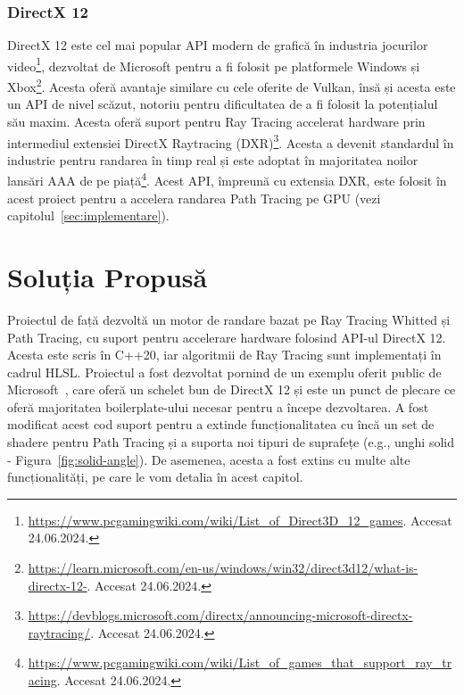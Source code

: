 \documentclass[12pt,a4paper]{report}
\numberwithin{equation}{section} %
\begin{document}
\subsection{DirectX 12}

DirectX 12 este cel mai popular API modern de grafică în industria jocurilor video\footnote{\url{https://www.pcgamingwiki.com/wiki/List_of_Direct3D_12_games}. Accesat 24.06.2024.},
dezvoltat de Microsoft pentru a fi folosit pe platformele Windows și Xbox\footnote{\url{https://learn.microsoft.com/en-us/windows/win32/direct3d12/what-is-directx-12-}. Accesat 24.06.2024.}.
Acesta oferă avantaje similare cu cele oferite de Vulkan, însă și acesta este
un API de nivel scăzut, notoriu pentru dificultatea de a fi folosit la potențialul său maxim.
Acesta oferă suport pentru Ray Tracing accelerat hardware
prin intermediul extensiei DirectX Raytracing (DXR)\footnote{\url{https://devblogs.microsoft.com/directx/announcing-microsoft-directx-raytracing/}. Accesat 24.06.2024.}.
Acesta a devenit standardul în industrie pentru randarea în timp real și este
adoptat în majoritatea noilor lansări AAA de pe piață\footnote{\url{https://www.pcgamingwiki.com/wiki/List_of_games_that_support_ray_tracing}. Accesat 24.06.2024.}.
Acest API, împreună cu extensia DXR, este folosit în acest proiect pentru
a accelera randarea Path Tracing pe GPU (vezi capitolul~\ref{sec:implementare}).

\chapter{\label{sec:solutie}Soluția Propusă}

Proiectul de față dezvoltă un motor de randare bazat pe Ray Tracing Whitted și Path Tracing, cu suport
pentru accelerare hardware folosind API-ul DirectX 12. Acesta este scris în C++20,
iar algoritmii de Ray Tracing sunt implementați în cadrul HLSL. Proiectul a fost
dezvoltat pornind de un exemplu oferit public de Microsoft~\cite{Schelet},
care oferă un schelet bun de DirectX 12 și este un punct de plecare ce oferă
majoritatea boilerplate-ului necesar pentru a începe dezvoltarea. A fost modificat acest cod
suport pentru a extinde funcționalitatea cu încă un set de shadere pentru Path Tracing și
a suporta noi tipuri de suprafețe (e.g., unghi solid - Figura~\ref{fig:solid-angle}). De asemenea,
acesta a fost extins cu multe alte funcționalități, pe care le vom detalia în acest
capitol.
\end{document}
